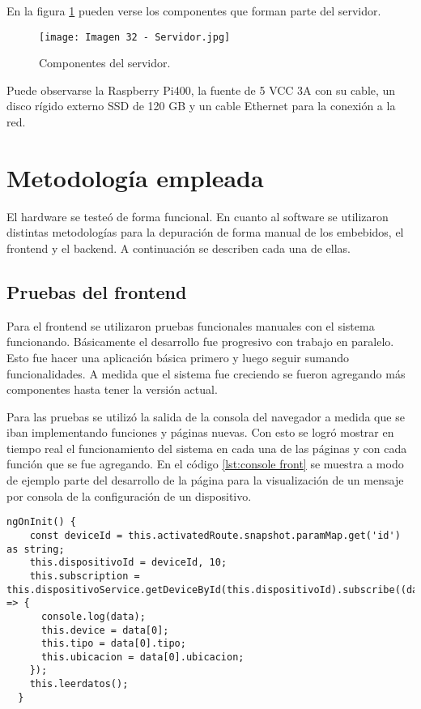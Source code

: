 En la figura \ref{fig:32} pueden verse los componentes que forman parte del servidor.

\begin{figure}[h]
\centering
\texttt{[image: Imagen 32 - Servidor.jpg]}
\caption[Servidor]{Componentes del servidor.}
\label{fig:32}
\end{figure}

Puede observarse la Raspberry Pi400, la fuente de 5 VCC 3A con su cable, un disco rígido externo SSD de 120 GB y un cable Ethernet para la conexión a la red.

\section{Metodología empleada}

El hardware se testeó de forma funcional. En cuanto al software se utilizaron distintas metodologías para la depuración de forma manual de los embebidos, el frontend y el backend. A continuación se describen cada una de ellas.

\subsection{Pruebas del frontend}

Para el frontend se utilizaron pruebas funcionales manuales con el sistema funcionando. Básicamente el desarrollo fue progresivo con trabajo en paralelo. Esto fue hacer una aplicación básica primero y luego seguir sumando funcionalidades. A medida que el sistema fue creciendo se fueron agregando más componentes hasta tener la versión actual.

Para las pruebas se utilizó la salida de la consola del navegador a medida que se iban implementando funciones y páginas nuevas. Con esto se logró mostrar en tiempo real el funcionamiento del sistema en cada una de las páginas y con cada función que se fue agregando. En el código \ref{lst:console front} se muestra a modo de ejemplo parte del desarrollo de la página para la visualización de un mensaje por consola de la configuración de un dispositivo.

\begin{lstlisting}[caption={Muestra por consola de los datos recibidos}, label={lst:console front}]
ngOnInit() {
    const deviceId = this.activatedRoute.snapshot.paramMap.get('id') as string;
    this.dispositivoId = deviceId, 10;
    this.subscription = this.dispositivoService.getDeviceById(this.dispositivoId).subscribe((data) => {
      console.log(data);
      this.device = data[0];
      this.tipo = data[0].tipo;
      this.ubicacion = data[0].ubicacion;
    });
    this.leerdatos();
  }
\end{lstlisting}

